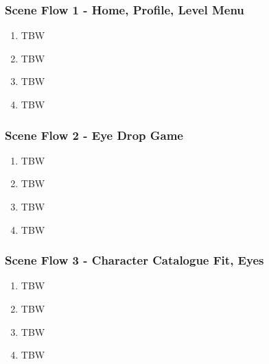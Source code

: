 \documentclass{article}
\begin{document}
\subsubsection{Scene Flow 1 - Home, Profile, Level Menu}
\begin{enumerate}
    \item TBW
    \item TBW
    \item TBW
    \item TBW
\end{enumerate}
\subsubsection{Scene Flow 2 - Eye Drop Game}
\begin{enumerate}
    \item TBW
    \item TBW
    \item TBW
    \item TBW
\end{enumerate}
\subsubsection{Scene Flow 3 - Character Catalogue Fit, Eyes}
\begin{enumerate}
    \item TBW
    \item TBW
    \item TBW
    \item TBW
\end{enumerate}
\end{document}
